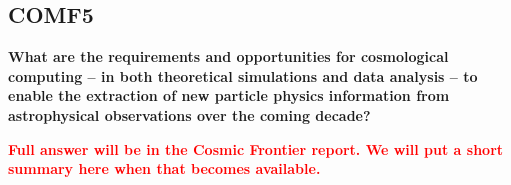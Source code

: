 \subsection{COMF5}
 
 {\bf
 What are the requirements and opportunities for cosmological computing -- in both
theoretical simulations and data analysis -- to enable the extraction of new particle
physics information from astrophysical observations over the coming decade?}

\textcolor{red}{
{\bf Full answer will be in the Cosmic Frontier report. We will put a short summary here when that becomes available.}}







